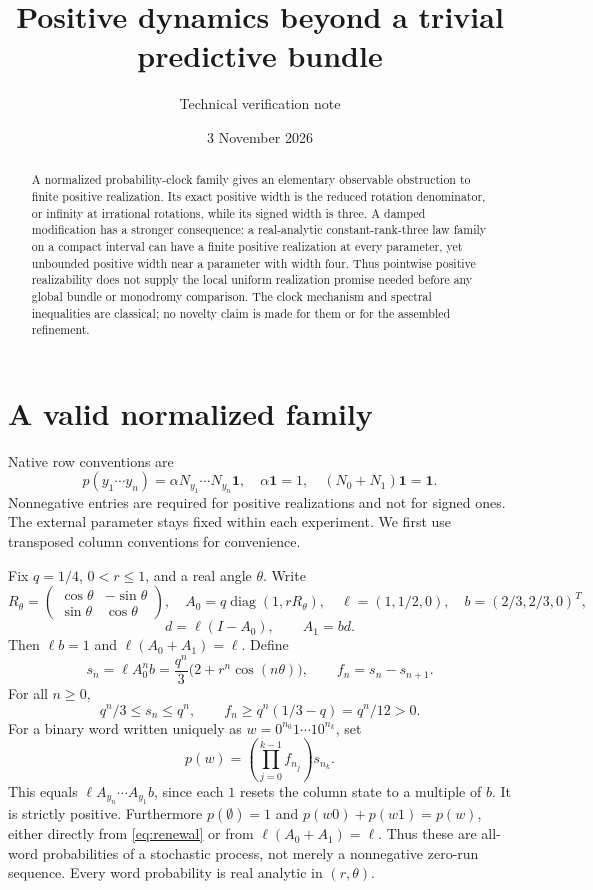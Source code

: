 \documentclass[11pt]{article}
\title{Positive dynamics beyond a trivial predictive bundle}
\author{Technical verification note}
\date{3 November 2026}
\newcommand{\one}{\mathbf 1}
\begin{document}
\maketitle
\begin{abstract}
A normalized probability-clock family gives an elementary observable obstruction to finite positive realization. Its exact positive width is the reduced rotation denominator, or infinity at irrational rotations, while its signed width is three. A damped modification has a stronger consequence: a real-analytic constant-rank-three law family on a compact interval can have a finite positive realization at every parameter, yet unbounded positive width near a parameter with width four. Thus pointwise positive realizability does not supply the local uniform realization promise needed before any global bundle or monodromy comparison. The clock mechanism and spectral inequalities are classical; no novelty claim is made for them or for the assembled refinement.
\end{abstract}

\section{A valid normalized family}
Native row conventions are
\[
 p(y_1\cdots y_n)=\alpha N_{y_1}\cdots N_{y_n}\one,
 \quad \alpha\one=1,
 \quad (N_0+N_1)\one=\one.
\]
Nonnegative entries are required for positive realizations and not for signed ones. The external parameter stays fixed within each experiment. We first use transposed column conventions for convenience.

Fix $q=1/4$, $0<r\leq1$, and a real angle $\theta$. Write
\[
 R_\theta=\begin{pmatrix}\cos\theta&-\sin\theta\\ \sin\theta&\cos\theta\end{pmatrix},
 \quad A_0=q\operatorname{diag}(1,rR_\theta),\quad
 \ell=(1,1/2,0),\quad b=(2/3,2/3,0)^T,
\]
\[
 d=\ell(I-A_0),\qquad A_1=bd.
\]
Then $\ell b=1$ and $\ell(A_0+A_1)=\ell$. Define
\[
 s_n=\ell A_0^n b=\frac{q^n}{3}\bigl(2+r^n\cos(n\theta)\bigr),
 \qquad f_n=s_n-s_{n+1}.
\]
For all $n\geq0$,
\[
 q^n/3\leq s_n\leq q^n,\qquad f_n\geq q^n(1/3-q)=q^n/12>0.
\]
For a binary word written uniquely as $w=0^{n_0}1\cdots1 0^{n_k}$, set
\begin{equation}\label{eq:renewal}
 p(w)=\left(\prod_{j=0}^{k-1}f_{n_j}\right)s_{n_k}.
\end{equation}
This equals $\ell A_{y_n}\cdots A_{y_1}b$, since each $1$ resets the column state to a multiple of $b$. It is strictly positive. Furthermore $p(\emptyset)=1$ and $p(w0)+p(w1)=p(w)$, either directly from \eqref{eq:renewal} or from $\ell(A_0+A_1)=\ell$. Thus these are all-word probabilities of a stochastic process, not merely a nonnegative zero-run sequence. Every word probability is real analytic in $(r,\theta)$.
\end{document}
